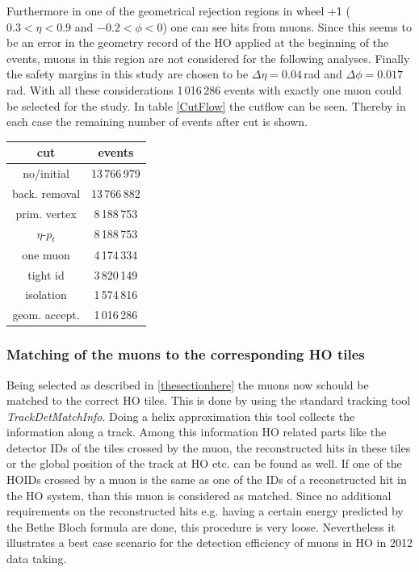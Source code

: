 			Furthermore in one of the geometrical rejection regions in wheel +1 ($0.3<\eta<0.9$ and $-0.2<\phi<0$) one can see hits from muons.
			Since this seems to be an error in the geometry record of the HO applied at the beginning of the events, muons in this region are not considered for the following analyses.
			Finally the safety margins in this study are chosen to be $\Delta\eta = 0.04$\,rad and $\Delta\phi = 0.017$\,rad.
			With all these considerations 1\,016\,286 events with exactly one muon could be selected for the study.
			In table \ref{CutFlow} the cutflow can be seen.
			Thereby in each case the remaining number of events after cut is shown.
			\begin{center}
			\label{CutFlow}
				\begin{tabular}{|c|c|}
					\hline
					\textbf{cut}  & \textbf{events} \\ \hline \hline
			 		no/initial    & 13\,766\,979 		\\ \hline
			 		back. removal & 13\,766\,882 		\\ \hline
			 		prim. vertex  &  8\,188\,753 		\\ \hline
			 		$\eta$-$p_t$  &  8\,188\,753 		\\ \hline
			 		one muon      &  4\,174\,334 		\\ \hline
			 		tight id      &  3\,820\,149 		\\ \hline
			 		isolation     &  1\,574\,816 		\\ \hline
			 		geom. accept. &  1\,016\,286 		\\ \hline
				\end{tabular}
			\end{center}
		\subsubsection{Matching of the muons to the corresponding HO tiles}
			Being selected as described in \ref{thesectionhere} the muons now schould be matched to the correct HO tiles.
			This is done by using the standard tracking tool \textit{TrackDetMatchInfo}.
			Doing a helix approximation this tool collects the information along a track.
			Among this information HO related parts like the detector IDs of the tiles crossed by the muon, the reconstructed hits in these tiles or the global position of the track at HO etc. can be
			found as well.
			If one of the HOIDs crossed by a muon is the same as one of the IDs of a reconstructed hit in the HO system, than this muon is considered as matched.
			Since no additional requirements on the reconstructed hits e.g. having a certain energy predicted by the Bethe Bloch formula are done, this procedure is very loose.
			Nevertheless it illustrates a best case scenario for the detection efficiency of muons in HO in 2012 data taking.
